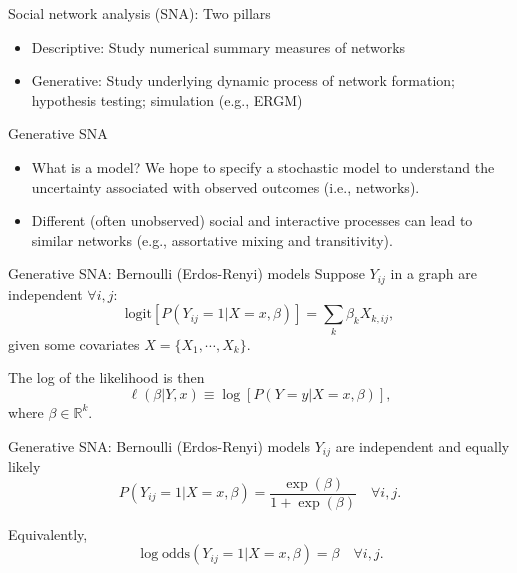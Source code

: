 \documentclass[10pt]{beamer}
\begin{document}
\begin{frame}{Social network analysis (SNA): Two pillars}
	\begin{itemize}
		\item Descriptive: Study numerical summary measures of networks
		\item Generative: Study underlying dynamic process of network formation; hypothesis testing; simulation (e.g., ERGM)
	\end{itemize}
\end{frame}

\begin{frame}{Generative SNA}
	\begin{itemize}
		\item What is a model?  We hope to specify a stochastic model to understand the uncertainty associated with observed outcomes (i.e., networks).
		\item Different (often unobserved) social and interactive processes can lead to similar networks (e.g., assortative mixing and transitivity).
	\end{itemize}
\end{frame}

\begin{frame}{Generative SNA: Bernoulli (Erdos-Renyi) models}
Suppose $Y_{ij}$ in a graph are independent $\forall i,j$:
	\begin{equation}
	\text{logit}[P(Y_{ij}=1 | X=x,\beta)] = \sum_k \beta_k X_{k,ij},
	\end{equation}
given some covariates $X =\{X_1, \cdots, X_k\}$.\\
\vspace{0.2cm}

The log of the likelihood is then
	\begin{equation}
	\ell(\beta|Y,x) \equiv \log[P(Y=y|X=x,\beta)],
	\end{equation}
where $\beta \in \mathbb{R}^{k}$.
\end{frame}

\begin{frame}{Generative SNA: Bernoulli (Erdos-Renyi) models}
$Y_{ij}$ are independent and equally likely
	\begin{equation}
	P(Y_{ij}=1 | X=x,\beta) = \frac{\exp(\beta)}{1+\exp(\beta)} \quad \forall i,j.
	\end{equation}
\vspace{0.2cm}

Equivalently,
	\begin{equation}
	\log\text{odds}(Y_{ij}=1 | X=x,\beta) = \beta \quad \forall i,j.
	\end{equation}
\end{frame}
\end{document}
